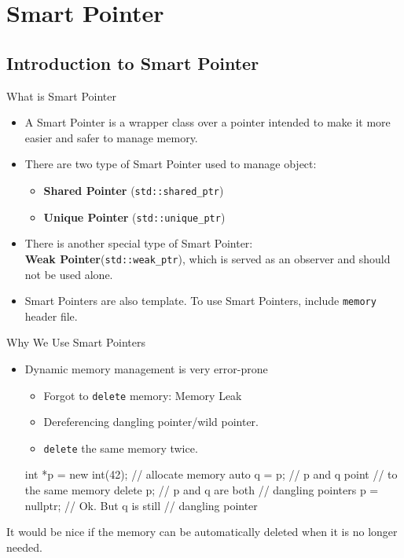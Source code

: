\section{Smart Pointer}
\subsection{Introduction to Smart Pointer}
\begin{frame}[fragile]{What is Smart Pointer}
  \begin{itemize}
    \item A Smart Pointer is a wrapper class over a pointer intended to make it more easier and safer to manage memory.
    \item There are two type of Smart Pointer used to manage object:
      \begin{itemize}
        \item \textbf{Shared Pointer} (\texttt{std::shared\_ptr})
        \item \textbf{Unique Pointer} (\texttt{std::unique\_ptr})
      \end{itemize}
    \item There is another special type of Smart Pointer:\\
     \textbf{Weak Pointer}(\texttt{std::weak\_ptr}), which is served as an observer and should not be used alone.\pause
    \item Smart Pointers are also template. To use Smart Pointers, include \texttt{memory} header file.
  \end{itemize}
\end{frame}
\begin{frame}[fragile]{Why We Use Smart Pointers}
  \begin{itemize}
    \item Dynamic memory management is very error-prone
    \begin{itemize}
      \item Forgot to \texttt{delete} memory: Memory Leak
      \item Dereferencing dangling pointer/wild pointer.
      \item \texttt{delete} the same memory twice.
    \end{itemize}\pause
  \begin{cpp}
int *p = new int(42); // allocate memory
auto q = p;           // p and q point 
                      // to the same memory
delete p;             // p and q are both
                      // dangling pointers
p = nullptr;          // Ok. But q is still 
                      // dangling pointer
  \end{cpp}
  \end{itemize}\pause
  It would be nice if the memory can be automatically deleted when it is no longer needed.
\end{frame}
